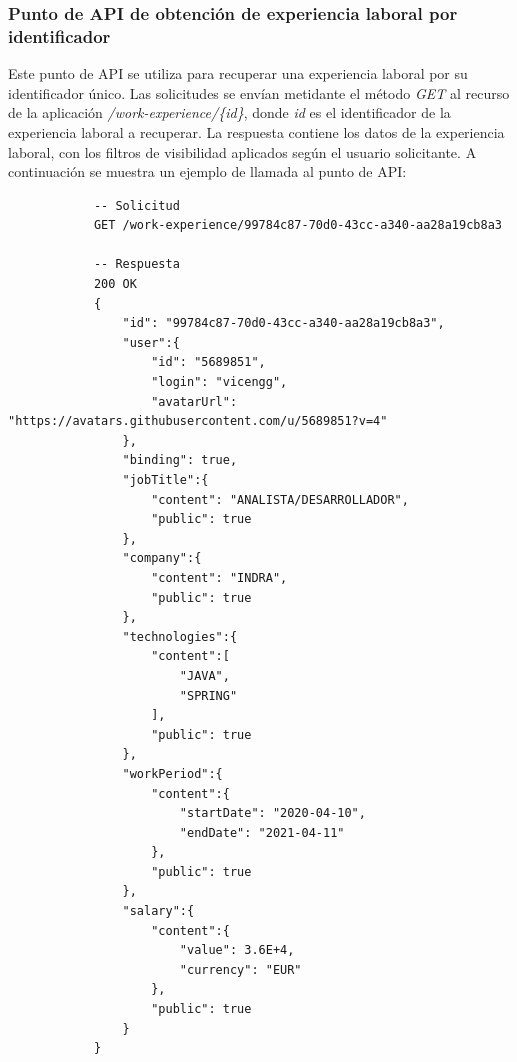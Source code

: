 \documentclass[a4paper, 12pt]{book}
\begin{document}
    \subsubsection{Punto de API de obtención de experiencia laboral por identificador}
    \label{subsec:get_work_experience_id}
    Este punto de API se utiliza para recuperar una experiencia laboral por su identificador único.
    Las solicitudes se envían metidante el método \emph{GET} al recurso de la aplicación \emph{/work-experience/\{id\}}, donde \emph{id} es el identificador de la experiencia laboral a recuperar.
    La respuesta contiene los datos de la experiencia laboral, con los filtros de visibilidad aplicados según el usuario solicitante.
    A continuación se muestra un ejemplo de llamada al punto de API:

        {\footnotesize
    \begin{verbatim}
			-- Solicitud
			GET /work-experience/99784c87-70d0-43cc-a340-aa28a19cb8a3

			-- Respuesta
			200 OK
			{
			    "id": "99784c87-70d0-43cc-a340-aa28a19cb8a3",
			    "user":{
			        "id": "5689851",
			        "login": "vicengg",
			        "avatarUrl": "https://avatars.githubusercontent.com/u/5689851?v=4"
			    },
			    "binding": true,
			    "jobTitle":{
			        "content": "ANALISTA/DESARROLLADOR",
			        "public": true
			    },
			    "company":{
			        "content": "INDRA",
			        "public": true
			    },
			    "technologies":{
			        "content":[
			            "JAVA",
			            "SPRING"
			        ],
			        "public": true
			    },
			    "workPeriod":{
			        "content":{
			            "startDate": "2020-04-10",
			            "endDate": "2021-04-11"
			        },
			        "public": true
			    },
			    "salary":{
			        "content":{
			            "value": 3.6E+4,
			            "currency": "EUR"
			        },
			        "public": true
			    }
			}
    \end{verbatim}
    }
\end{document}
